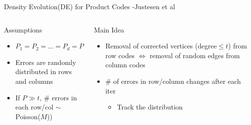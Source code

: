 \documentclass[10pt,xcolor=table]{beamer}
\begin{document}
	\begin{frame}{Density Evolution(DE) for Product Codes -Justesen et al}
	   
	   \begin{columns}
	   	
	   	\begin{block}{Assumptions}
	   		
	   		\begin{itemize}
	   			\item $P_1=P_2= \ldots =P_d = P$
	   			\item Errors are \alert{randomly distributed} in rows and columns
	   			\item If $P \gg t$, \alert{\# errors} in each row/col $\sim$ \alert{Poisson}($M$))
	   		\end{itemize}
	   	\end{block}
	   	\pause
	   	\begin{block}{Main Idea}
	   		\begin{itemize}
	   			\item Removal of \alert{corrected vertices} (degree$\leq t$) from row codes $\Leftrightarrow$ removal of random edges from column codes
	   			\item \# of errors in row/column changes after each iter
	   			\begin{itemize}
	   				\item Track the distribution
	   			\end{itemize}
	   		\end{itemize}
	   	\end{block}
	   	 	

\end{columns}
\end{frame}
\end{document}

